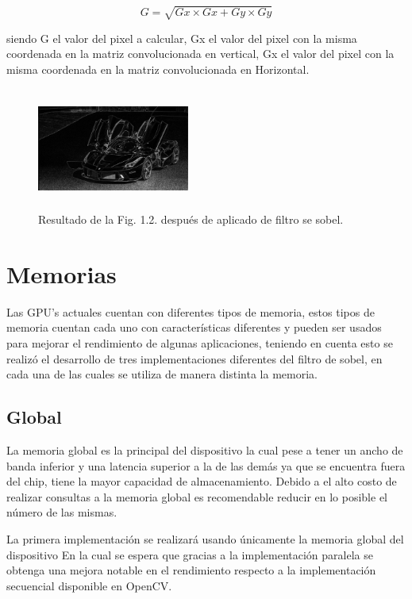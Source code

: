 \documentclass[journal]{IEEEtran}
\begin{document}
\[
  G = \sqrt{Gx\times Gx + Gy\times Gy}
\]

siendo G el valor del pixel a calcular, Gx el valor del pixel con la misma coordenada en la matriz convolucionada en vertical, Gx el valor del pixel con la misma coordenada en la matriz convolucionada en Horizontal.

\begin{figure}[h]
    \centering
    \includegraphics[width=5cm, height=4cm]{sobel.jpg}
    \caption{Resultado de la Fig. 1.2. despu\'es de aplicado de filtro se sobel.}
    \label{fig:my_label2}
\end{figure}


\section{Memorias}

Las GPU’s actuales cuentan con diferentes tipos de memoria, estos tipos de memoria cuentan cada uno con caracter\'isticas diferentes y pueden ser usados para mejorar el rendimiento de algunas aplicaciones, teniendo en cuenta esto se realiz\'o el desarrollo de tres implementaciones diferentes del filtro de sobel, en cada una de las cuales se utiliza de manera distinta la memoria.


\subsection{Global}
La memoria global es la principal del dispositivo la cual pese a tener un ancho de banda inferior y una latencia superior a la de las dem\'as ya que se encuentra fuera del chip, tiene la mayor capacidad de almacenamiento. Debido a el alto costo de realizar consultas a la memoria global es recomendable reducir en lo posible el n\'umero de las mismas.

La primera implementaci\'on se realizar\'a usando \'unicamente la memoria global del dispositivo En la cual se espera que gracias a la implementación paralela se obtenga una mejora notable en el rendimiento respecto a la implementaci\'on secuencial disponible en OpenCV.
\end{document}
